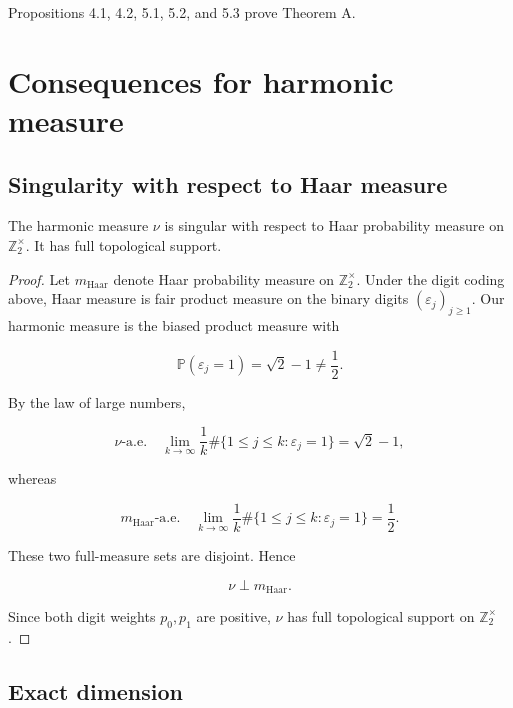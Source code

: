 \documentclass[11pt,a4paper]{scrartcl}
\begin{document}
Propositions 4.1, 4.2, 5.1, 5.2, and 5.3 prove Theorem A.


\section{Consequences for harmonic measure}\label{sec:consequences-for-harmonic-measure}



\subsection{Singularity with respect to Haar measure}\label{subsec:singularity-with-respect-to-haar-measure}


\begin{corollary}\label{cor:singularity-support}
The harmonic measure \(\nu\) is singular with respect to
Haar probability measure on \(\mathbb Z_2^\times\). It has full topological
support.

\end{corollary}
\begin{proof}
Let \(m_{\operatorname{Haar}}\) denote Haar probability measure on
\(\mathbb Z_2^\times\). Under the digit coding above, Haar measure is fair
product measure on the binary digits \((\varepsilon_j)_{j\ge 1}\). Our
harmonic measure is the biased product measure with

\[
\mathbb P(\varepsilon_j=1)=\sqrt2-1\ne \frac12 .
\]

By the law of large numbers,

\[
\nu\text{-a.e.}\quad
\lim_{k\to\infty}
\frac1k
\#\{1\le j\le k:\varepsilon_j=1\}
=
\sqrt2-1,
\]

whereas

\[
m_{\operatorname{Haar}}\text{-a.e.}\quad
\lim_{k\to\infty}
\frac1k
\#\{1\le j\le k:\varepsilon_j=1\}
=
\frac12 .
\]

These two full-measure sets are disjoint. Hence

\[
\nu\perp m_{\operatorname{Haar}}.
\]

Since both digit weights \(p_0,p_1\) are positive, \(\nu\) has full
topological support on \(\mathbb Z_2^\times\).
\end{proof}


\subsection{Exact dimension}\label{subsec:exact-dimension}
\end{document}
